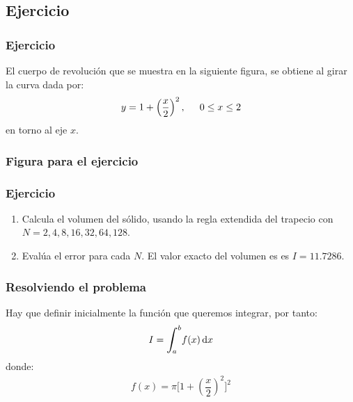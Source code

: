 \documentclass[12pt]{beamer}
\begin{document}
\subsection{Ejercicio}

\begin{frame}
\frametitle{Ejercicio}
El cuerpo de revolución que se muestra en la siguiente figura, se obtiene al girar la curva dada por:
\begin{align*}
y = 1 + \left( \dfrac{x}{2} \right)^{2}, \hspace{0.5cm} 0 \leq x \leq 2
\end{align*}
en torno al eje $x$.
\end{frame}
\begin{frame}
\frametitle{Figura para el ejercicio}
\begin{figure}
	\centering
	
\end{figure}
\end{frame}
\begin{frame}
\frametitle{Ejercicio}
\begin{enumerate}[<+->]
\item Calcula el volumen del sólido, usando la regla extendida del trapecio con $N = 2, 4, 8, 16, 32, 64, 128$.
\item Evalúa el error para cada $N$. El valor exacto del volumen es es $I = 11.7286$.
\end{enumerate}
\end{frame}
\begin{frame}
\frametitle{Resolviendo el problema}
Hay que definir inicialmente la función que queremos integrar, por tanto:
\pause
\begin{align*}
I = \scaleint{6ex}_{\bs a}^{b} f (x) \dd{x}
\end{align*}
\pause
donde:
\begin{align*}
f (x) = \pi  \bigg[ 1 + \left( \dfrac{x}{2} \right)^{2} \bigg]^{2}
\end{align*}
\end{frame}
\end{document}
